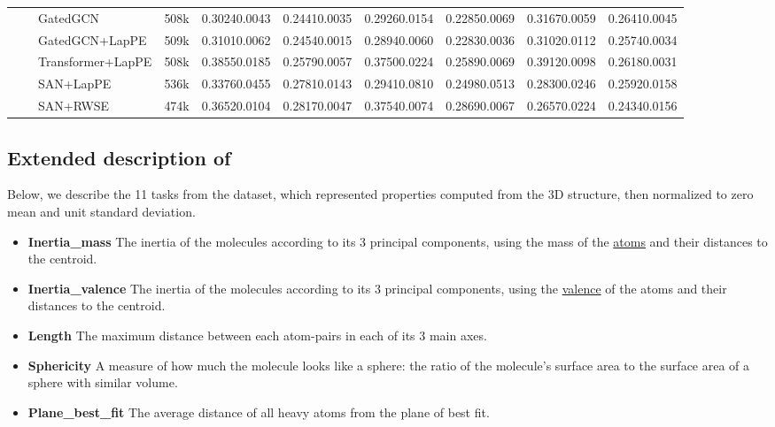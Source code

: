 \documentclass{article}
\begin{document}
\begin{table}[h]
\begin{adjustwidth}{-2.5 cm}{-2.5 cm}
{\begin{tabular}{c c l c A B A B A B}
    & & GatedGCN &508k &0.30240.0043 &0.24410.0035 &0.29260.0154 &0.22850.0069 &0.31670.0059 &0.26410.0045 \\
    & & GatedGCN+LapPE &509k &0.31010.0062 &0.24540.0015 &0.28940.0060 &0.22830.0036 &0.31020.0112 &0.25740.0034 \\
    & & Transformer+LapPE &508k &0.38550.0185 &0.25790.0057 &0.37500.0224 &0.25890.0069 &0.39120.0098 &0.26180.0031 \\
    & & SAN+LapPE &536k &0.33760.0455 &0.27810.0143 &0.29410.0810 &0.24980.0513 &0.28300.0246 &0.25920.0158 \\
    & & SAN+RWSE &474k &0.36520.0104 &0.28170.0047 &0.37540.0074 &0.28690.0067 &0.26570.0224 &0.24340.0156 \\
\bottomrule
    \end{tabular}
    }
    \end{adjustwidth}
\end{table}



\subsection{Extended description of \pepstruct}
\label{app:peptstruct_description}

Below, we describe the 11 tasks from the \pepstruct dataset, which represented properties computed from the 3D structure, then normalized to zero mean and unit standard deviation.
\vspace{-3pt}
\begin{itemize}[leftmargin=1.5em]
    \vspace{-3pt}
    \item \textbf{Inertia\_mass} The inertia of the molecules according to its 3 principal components, using the mass of the \underline{atoms} and their distances to the centroid.
    \vspace{-3pt}
    \item \textbf{Inertia\_valence} The inertia of the molecules according to its 3 principal components, using the \underline{valence} of the atoms and their distances to the centroid.
    \vspace{-3pt}
    \item \textbf{Length} The maximum distance between each atom-pairs in each of its 3 main axes.
    \vspace{-3pt}
    \item \textbf{Sphericity} A measure of how much the molecule looks like a sphere: the ratio of the molecule's surface area to the surface area of a sphere with similar volume.
    \vspace{-3pt}
    \item \textbf{Plane\_best\_fit} The average distance of all heavy atoms from the plane of best fit.
\end{itemize}
\end{document}
